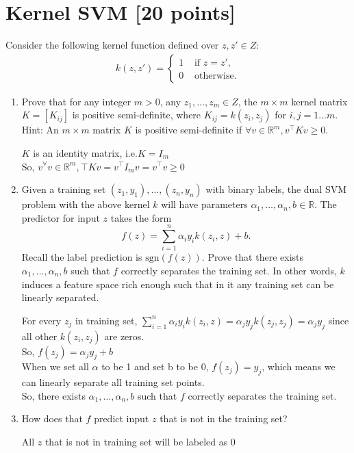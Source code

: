 \documentclass[a4paper]{article}
\theoremstyle{definition}
\newcommand{\sgn}{\mathrm{sgn}}
\def\R{\mathbb R}
\newenvironment{soln}{
    \leavevmode\color{blue}\ignorespaces
}{}
\begin{document}
\section{Kernel SVM [20 points]}
Consider the following kernel function defined over $z,z'\in Z$:
\begin{align*}
k(z,z') =
\begin{cases}
1 & \text{~if~} z=z', \\
0 & \text{~otherwise.}
\end{cases}
\end{align*}
\begin{enumerate}
\item Prove that for any integer $m>0$, any $z_1, \ldots, z_m \in Z$, the $m \times m$ kernel matrix $K=[K_{ij}]$ is positive semi-definite, where $K_{ij}=k(z_i, z_j)$ for $i,j=1\ldots m$.
Hint: An $m\times m$ matrix $K$ is positive semi-definite if $\forall v \in \R^m, v^\top K v \ge 0$.
\begin{soln}

$K$ is an identity matrix, i.e.$ K = I_{m}$\\
So, $v^\forall v \in \R^m, \top K v = v^\top I_{m} v =  v^\top v \ge 0$
\end{soln}

\item Given a training set $(z_1, y_1), \ldots, (z_n, y_n)$ with binary labels, the dual SVM problem with the above kernel $k$ will have parameters $\alpha_1, \ldots, \alpha_n, b \in \R$.  The predictor for input $z$ takes the form
$$f(z) = \sum_{i=1}^n \alpha_i y_i k(z_i, z) + b.$$
Recall the label prediction is $\sgn(f(z))$.
Prove that there exists $\alpha_1, \ldots, \alpha_n, b$ such that $f$ correctly separates the training set.
In other words, $k$ induces a feature space rich enough such that in it any training set can be linearly separated.
\begin{soln}

For every $z_{j}$ in training set, $ \sum_{i=1}^n \alpha_i y_i k(z_i, z) =  \alpha_j y_j k(z_j, z_j) = \alpha_j y_j$ since all other $k(z_i, z_j)$ are zeros.\\
So, $f(z_{j}) = \alpha_j y_j + b$\\
When we set all $\alpha$ to be 1 and set b to be 0, $f(z_{j}) = y_j$, which means we can linearly separate all training set points.\\
So, there exists $\alpha_1, \ldots, \alpha_n, b$ such that $f$ correctly separates the training set.
\end{soln}


\item How does that $f$ predict input $z$ that is not in the training set?

\begin{soln}
All $z$ that is not in training set will be labeled as 0
\end{soln}

\end{enumerate}
\end{document}
